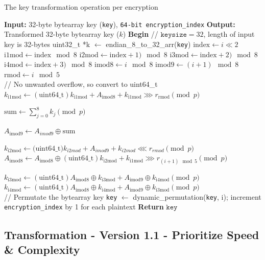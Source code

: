 \documentclass[fleqn, a4paper,12pt]{article}
\newcommand{\COMMENT}[1]{\State \textcolor[HTML]{003e57}{// #1}}
\begin{document}
\begin{algorithm}[H] %
\caption{The key transformation operation per encryption}
\begin{algorithmic}[1]  %
\State \textbf{Input:} 32-byte bytearray key (\texttt{key}), \texttt{64-bit encryption\_index}
\State \textbf{Output:} Transformed 32-byte bytearray key ($k$)
\State \textbf{Begin}
\COMMENT{$\texttt{keysize} = 32$, length of input key is 32-bytes}
\State uint32\_t *k $\gets$ endian\_8\_to\_32\_arr(\texttt{key})
	\State $\mathrm{index} \gets i \ll 2$
	\State $\mathrm{i1mod} \gets \mathrm{index} \mod 8$
	\State $\mathrm{i2mod} \gets \mathrm{index}+1) \mod 8$
	\State $\mathrm{i3mod} \gets \mathrm{index}+2) \mod 8$
	\State $\mathrm{i4mod} \gets \mathrm{index}+3) \mod 8$
	\State $\mathrm{imod8} \gets i \mod 8$
	\State $\mathrm{imod9} \gets (i+1) \mod 8$
	\State $\mathrm{rmod} \gets i \mod 5$ \\

	\COMMENT{No unwanted overflow, so convert to uint64\_t}
	\State $k_\mathrm{i1mod} \gets \mathrm{(uint64\_t)} k_\mathrm{i1mod} + A_\mathrm{imod8} + k_\mathrm{i1mod} \ggg r_\mathrm{rmod}  \pmod p $

	\State $ \mathrm{sum} \gets \displaystyle \sum_{j=0}^8 k_j \pmod p $

	\State $A_\mathrm{imod9} \gets A_{imod9} \oplus \text{sum}$

	\State $k_\mathrm{i2mod} \gets \text{(uint64\_t)} k_{i2mod} + A_{imod9} + k_{i2mod} \lll r_{rmod} \pmod p$
	\State $A_\mathrm{imod8} \gets A_\mathrm{imod8} \oplus \mathrm{(uint64\_t)} k_\mathrm{i2mod} + k_\mathrm{i1mod} \ggg r_{(i+1) \mod 5} \pmod p$

	\State $k_\mathrm{i3mod} \gets \mathrm{(uint64\_t)} A_\mathrm{imod8} \oplus k_\mathrm{i3mod} + A_\mathrm{imod9} \oplus k_\mathrm{i4mod} \pmod p$
	\State $k_\mathrm{i4mod} \gets  \mathrm{(uint64\_t)} A_\mathrm{imod8} \oplus k_\mathrm{i4mod} + A_\mathrm{imod9} \oplus k_\mathrm{i3mod} \pmod p$ \\

	\COMMENT{Permutate the bytearray key}
	\State \texttt{key} $\gets$ dynamic\_permutation(\texttt{key}, i);
\State increment \texttt{encryption\_index} by 1 for each plaintext
\EndFor
\State \textbf{Return} $\texttt{key}$
\end{algorithmic}
\end{algorithm}

\subsection{Transformation - Version 1.1 - Prioritize Speed \& Complexity}
\end{document}
